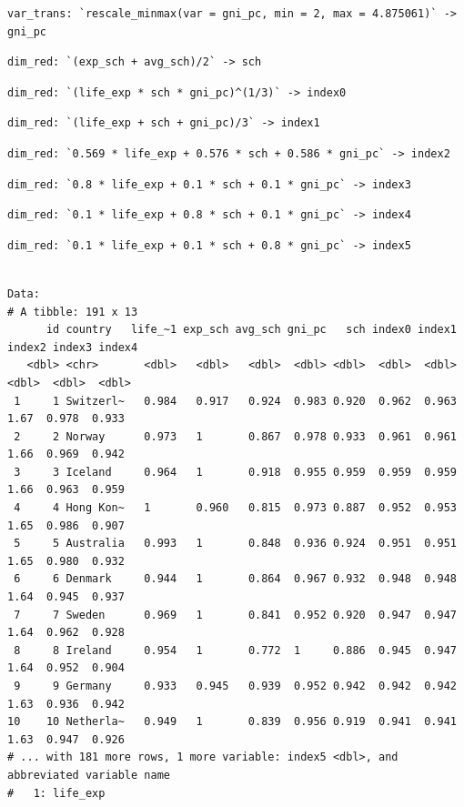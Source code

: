 \documentclass[
]{article}
\begin{document}
\begin{verbatim}
var_trans: `rescale_minmax(var = gni_pc, min = 2, max = 4.875061)` -> gni_pc
\end{verbatim}

\begin{verbatim}
dim_red: `(exp_sch + avg_sch)/2` -> sch
\end{verbatim}

\begin{verbatim}
dim_red: `(life_exp * sch * gni_pc)^(1/3)` -> index0
\end{verbatim}

\begin{verbatim}
dim_red: `(life_exp + sch + gni_pc)/3` -> index1
\end{verbatim}

\begin{verbatim}
dim_red: `0.569 * life_exp + 0.576 * sch + 0.586 * gni_pc` -> index2
\end{verbatim}

\begin{verbatim}
dim_red: `0.8 * life_exp + 0.1 * sch + 0.1 * gni_pc` -> index3
\end{verbatim}

\begin{verbatim}
dim_red: `0.1 * life_exp + 0.8 * sch + 0.1 * gni_pc` -> index4
\end{verbatim}

\begin{verbatim}
dim_red: `0.1 * life_exp + 0.1 * sch + 0.8 * gni_pc` -> index5
\end{verbatim}

\begin{verbatim}

Data: 
# A tibble: 191 x 13
      id country   life_~1 exp_sch avg_sch gni_pc   sch index0 index1 index2 index3 index4
   <dbl> <chr>       <dbl>   <dbl>   <dbl>  <dbl> <dbl>  <dbl>  <dbl>  <dbl>  <dbl>  <dbl>
 1     1 Switzerl~   0.984   0.917   0.924  0.983 0.920  0.962  0.963   1.67  0.978  0.933
 2     2 Norway      0.973   1       0.867  0.978 0.933  0.961  0.961   1.66  0.969  0.942
 3     3 Iceland     0.964   1       0.918  0.955 0.959  0.959  0.959   1.66  0.963  0.959
 4     4 Hong Kon~   1       0.960   0.815  0.973 0.887  0.952  0.953   1.65  0.986  0.907
 5     5 Australia   0.993   1       0.848  0.936 0.924  0.951  0.951   1.65  0.980  0.932
 6     6 Denmark     0.944   1       0.864  0.967 0.932  0.948  0.948   1.64  0.945  0.937
 7     7 Sweden      0.969   1       0.841  0.952 0.920  0.947  0.947   1.64  0.962  0.928
 8     8 Ireland     0.954   1       0.772  1     0.886  0.945  0.947   1.64  0.952  0.904
 9     9 Germany     0.933   0.945   0.939  0.952 0.942  0.942  0.942   1.63  0.936  0.942
10    10 Netherla~   0.949   1       0.839  0.956 0.919  0.941  0.941   1.63  0.947  0.926
# ... with 181 more rows, 1 more variable: index5 <dbl>, and abbreviated variable name
#   1: life_exp
\end{verbatim}
\end{document}
